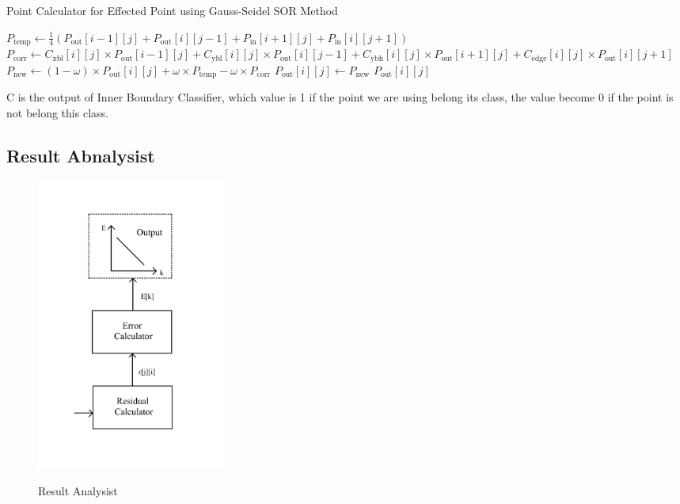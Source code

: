\documentclass[12pt]{article}
\begin{document}
    \begin{algorithm}
    \caption{Point Calculator for Effected Point using Gauss-Seidel SOR Method}
    \begin{algorithmic}[1]
        \State $P_{\text{temp}} \gets \frac{1}{4} \left( P_{\text{out}}[i-1][j] + P_{\text{out}}[i][j-1] + P_{\text{in}}[i+1][j] + P_{\text{in}}[i][j+1] \right)$
        \State $P_{\text{corr}} \gets C_{\text{xbl}}[i][j] \times P_{\text{out}}[i-1][j] + C_{\text{ybl}}[i][j] \times P_{\text{out}}[i][j-1] + C_{\text{ybh}}[i][j] \times P_{\text{out}}[i+1][j] + C_{\text{edge}}[i][j] \times P_{\text{out}}[i][j+1]$
        \State $P_{\text{new}} \gets (1 - \omega) \times P_{\text{out}}[i][j] + \omega \times P_{\text{temp}} - \omega \times P_{\text{corr}}$
        \State $P_{\text{out}}[i][j] \gets P_{\text{new}}$
        \State \Return $P_{\text{out}}[i][j]$
    \EndProcedure
    \end{algorithmic}
    \end{algorithm}
    
C is the output of Inner Boundary Classifier, which value is 1 if the point we are 
using belong its class, the value become 0 if the point is not belong this class.

\subsection{Result Abnalysist}



\begin{figure}[H]
    \centering
    \includegraphics[width=0.3\textwidth]{Solver-Op.jpg}
    \label{Grid Generator.jpg}
    \caption{Result Analysist}
\end{figure}
\end{document}
